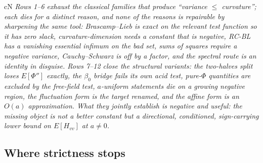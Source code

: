 \begin{claimbox}{cN}
\emph{Rows 1--6 exhaust the classical families that produce ``variance $\le$ curvature''; each dies
for a distinct reason, and none of the reasons is repairable by sharpening the same tool: Brascamp--Lieb
is exact on the relevant test function so it has zero slack, curvature-dimension needs a constant that
is negative, RC-BL has a vanishing essential infimum on the bad set, sums of squares require a negative
variance, Cauchy--Schwarz is off by a factor, and the spectral route is an identity in disguise. Rows
7--12 close the structural variants: the two-halves split loses $E[\Phi'']$ exactly, the $\beta_{0}$
bridge fails its own acid test, pure-$\Phi$ quantities are excluded by the free-field test, $a$-uniform
statements die on a growing negative region, the fluctuation form is the target renamed, and the affine
form is an $O(a)$ approximation. What they jointly establish is negative and useful: the missing object
is not a better constant but a \emph{directional, conditioned, sign-carrying} lower bound on
$E[H_{vv}]$ at $a\neq0$.} \LN{}
\end{claimbox}


\subsection{Where strictness stops}
\label{sec:h1s-limit}

